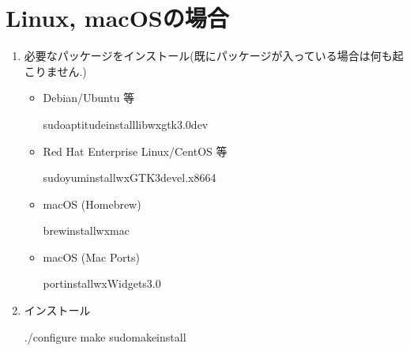 \documentclass[letterpaper,10pt,dvipdfmx,openany]{sphinxmanual}
\begin{document}
\section{Linux, macOSの場合}
\label{\detokenize{install:linux-macos}}\begin{enumerate}
%
\item {} 
\sphinxAtStartPar
必要なパッケージをインストール(既にパッケージが入っている場合は何も起こりません.)
\begin{itemize}
\item {} 
\sphinxAtStartPar
Debian/Ubuntu 等

\begin{sphinxVerbatim}[commandchars=\\\{\}]
\PYGZdl{}sudoaptitudeinstalllibwxgtk3.0\PYGZhy{}dev
\end{sphinxVerbatim}

\item {} 
\sphinxAtStartPar
Red Hat Enterprise Linux/CentOS 等

\begin{sphinxVerbatim}[commandchars=\\\{\}]
\PYGZdl{}sudoyuminstallwxGTK3\PYGZhy{}devel.x86\PYGZus{}64
\end{sphinxVerbatim}

\item {} 
\sphinxAtStartPar
macOS (Homebrew)

\begin{sphinxVerbatim}[commandchars=\\\{\}]
\PYGZdl{}brewinstallwxmac
\end{sphinxVerbatim}

\item {} 
\sphinxAtStartPar
macOS (Mac Ports)

\begin{sphinxVerbatim}[commandchars=\\\{\}]
\PYGZdl{}portinstallwxWidgets\PYGZhy{}3.0
\end{sphinxVerbatim}

\end{itemize}

\item {} 
\sphinxAtStartPar
インストール

\begin{sphinxVerbatim}[commandchars=\\\{\}]
\PYGZdl{}./configure
\PYGZdl{}make
\PYGZdl{}sudomakeinstall
\end{sphinxVerbatim}

\end{enumerate}
\end{document}
